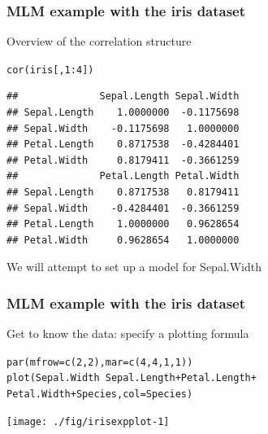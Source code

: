 \documentclass[xcolor=table, xcolor=dvipsnames]{beamer}\usepackage[]{graphicx}\usepackage[]{color}
\makeatletter
\newcommand{\hlnum}[1]{\textcolor[rgb]{0,0,0}{#1}}
\newcommand{\hlopt}[1]{\textcolor[rgb]{0,0,0}{#1}}
\newcommand{\hlstd}[1]{\textcolor[rgb]{0,0,0}{#1}}
\newcommand{\hlkwc}[1]{\textcolor[rgb]{1,0,1}{#1}}
\newcommand{\hlkwd}[1]{\textcolor[rgb]{0,0,1}{#1}}
\newenvironment{kframe}{%
 \def\at@end@of@kframe{}%
 \ifinner\ifhmode%
  \def\at@end@of@kframe{\end{minipage}}%
  \begin{minipage}{\columnwidth}%
 \fi\fi%
 \def\FrameCommand##1{\hskip\@totalleftmargin \hskip-\fboxsep
 \colorbox{shadecolor}{##1}\hskip-\fboxsep
     \hskip-\linewidth \hskip-\@totalleftmargin \hskip\columnwidth}%
 \MakeFramed {\advance\hsize-\width
   \@totalleftmargin\z@ \linewidth\hsize
   \@setminipage}}%
 {\par\unskip\endMakeFramed%
 \at@end@of@kframe}
\newenvironment{knitrout}{}{} %
\makeatother
\begin{document}

\begin{frame}[fragile]\frametitle{MLM example with the iris dataset}
Overview of the correlation structure
\begin{knitrout}
\color{fgcolor}\begin{kframe}
\begin{alltt}
\hlkwd{cor}\hlstd{(iris[,}\hlnum{1}\hlopt{:}\hlnum{4}\hlstd{])}
\end{alltt}
\begin{verbatim}
##              Sepal.Length Sepal.Width
## Sepal.Length    1.0000000  -0.1175698
## Sepal.Width    -0.1175698   1.0000000
## Petal.Length    0.8717538  -0.4284401
## Petal.Width     0.8179411  -0.3661259
##              Petal.Length Petal.Width
## Sepal.Length    0.8717538   0.8179411
## Sepal.Width    -0.4284401  -0.3661259
## Petal.Length    1.0000000   0.9628654
## Petal.Width     0.9628654   1.0000000
\end{verbatim}
\end{kframe}
\end{knitrout}
We will attempt to set up a model for Sepal.Width
\end{frame}


\begin{frame}[fragile]\frametitle{MLM example with the iris dataset}
Get to know the data: specify a plotting formula



\begin{knitrout}\small
{}\color{fgcolor}\begin{kframe}
\begin{alltt}
\hlkwd{par}\hlstd{(}\hlkwc{mfrow}\hlstd{=}\hlkwd{c}\hlstd{(}\hlnum{2}\hlstd{,}\hlnum{2}\hlstd{),} \hlkwc{mar}\hlstd{=}\hlkwd{c}\hlstd{(}\hlnum{4}\hlstd{,}\hlnum{4}\hlstd{,}\hlnum{1}\hlstd{,}\hlnum{1}\hlstd{))}
\hlkwd{plot}\hlstd{(Sepal.Width} \hlopt{~} \hlstd{Sepal.Length} \hlopt{+} \hlstd{Petal.Length} \hlopt{+}
       \hlstd{Petal.Width} \hlopt{+} \hlstd{Species,} \hlkwc{col}\hlstd{=Species)}
\end{alltt}
\end{kframe}

{\centering \texttt{[image: ./fig/irisexpplot-1]} 

}



\end{knitrout}

\end{frame}
\end{document}
